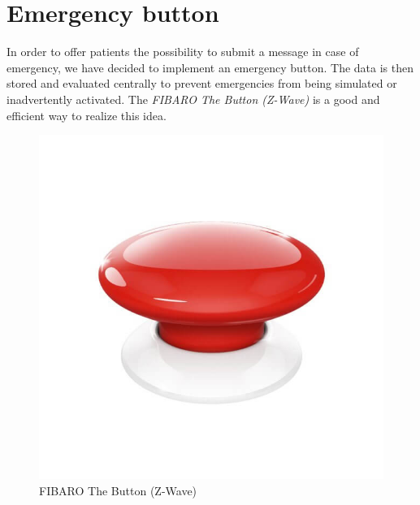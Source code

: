 \section{Emergency button}
In order to offer patients the possibility to submit a message in case of emergency, we have decided to implement an emergency button. The data is then stored and evaluated centrally to prevent emergencies from being simulated or inadvertently activated. The \textit{FIBARO The Button (Z-Wave)} is a good and efficient way to realize this idea.
\newpage
\begin{figure}[h]
	\centering
	\includegraphics[width=.4\textwidth]{images/CostAnalysis/fibaroEmergency} 
	\caption{FIBARO The Button (Z-Wave)}
	\label{fig:fibaroEmergency}
\end{figure}

